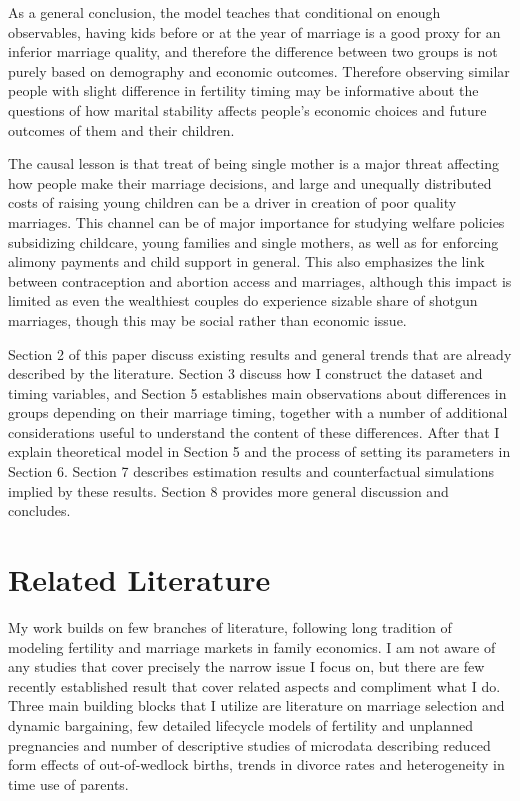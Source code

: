 \documentclass[12pt,letter]{article}
\begin{document}
As a general conclusion, the model teaches that conditional on enough observables, having kids before or at the year of marriage is a good proxy for an inferior marriage quality, and therefore the difference between two groups is not purely based on demography and economic outcomes. Therefore observing similar people with slight difference in fertility timing may be informative about the questions of how marital stability affects people's economic choices and future outcomes of them and their children.

The causal lesson is that treat of being single mother is a major threat affecting how people make their marriage decisions, and large and unequally distributed costs of raising young children can be a driver in creation of poor quality marriages. This channel can be of major importance for studying welfare policies subsidizing childcare, young families and single mothers, as well as for enforcing alimony payments and child support in general. This also emphasizes the link between contraception and abortion access and marriages, although this impact is limited as even the wealthiest couples do experience sizable share of shotgun marriages, though this may be social rather than economic issue.

Section 2 of this paper discuss existing results and general trends that are already described by the literature. Section 3 discuss how I construct the dataset and timing variables, and Section 5 establishes main observations about differences in groups depending on their marriage timing, together with a number of additional considerations useful to understand the content of these differences. After that I explain theoretical model in Section 5 and the process of setting its parameters in Section 6. Section 7 describes estimation results and counterfactual simulations implied by these results. Section 8 provides more general discussion and concludes.

\section{Related Literature}

My work builds on few branches of literature, following long tradition of modeling fertility and marriage markets in family economics. I am not aware of any studies that cover precisely the narrow issue I focus on, but there are few recently established result that cover related aspects and compliment what I do. Three main building blocks that I utilize are literature on marriage selection and dynamic bargaining, few detailed lifecycle models of fertility and unplanned pregnancies and number of descriptive studies of microdata describing reduced form effects of out-of-wedlock births, trends in divorce rates and heterogeneity in time use of parents.
\end{document}
